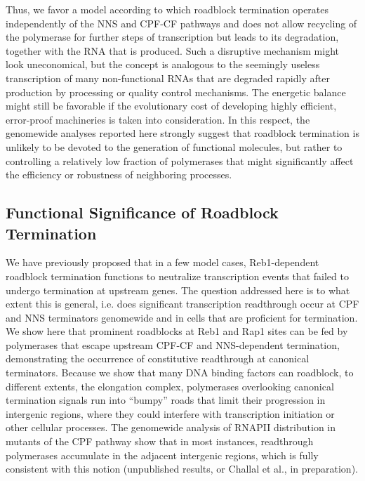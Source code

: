 Thus, we favor a model according to which roadblock termination operates independently of the NNS and CPF-CF pathways and does not allow recycling of the polymerase for further steps of transcription but leads to its degradation, together with the RNA that is produced. Such a disruptive mechanism might look uneconomical, but the concept is analogous to the seemingly useless transcription of many non-functional RNAs that are degraded rapidly after production by processing or quality control mechanisms. The energetic balance might still be favorable if the evolutionary cost of developing highly efficient, error-proof machineries is taken into consideration. In this respect, the genomewide analyses reported here strongly suggest that roadblock termination is unlikely to be devoted to the generation of functional molecules, but rather to controlling a relatively low fraction of polymerases that might significantly affect the efficiency or robustness of neighboring processes.


\singlespacing
\subsection*{Functional Significance of Roadblock Termination}
\doublespacing

We have previously proposed that in a few model cases, Reb1-dependent roadblock termination functions to neutralize transcription events that failed to undergo termination at upstream genes. The question addressed here is to what extent this is general, i.e. does significant transcription readthrough occur at CPF and NNS terminators genomewide and in cells that are proficient for termination. We show here that prominent roadblocks at Reb1 and Rap1 sites can be fed by polymerases that escape upstream CPF-CF and NNS-dependent termination, demonstrating the occurrence of constitutive readthrough at canonical terminators. Because we show that many DNA binding factors can roadblock, to different extents, the elongation complex, polymerases overlooking canonical termination signals run into “bumpy” roads that limit their progression in intergenic regions, where they could interfere with transcription initiation or other cellular processes. The genomewide analysis of RNAPII distribution in mutants of the CPF pathway show that in most instances, readthrough polymerases accumulate in the adjacent intergenic regions, which is fully consistent with this notion (unpublished results, or Challal et al., in preparation). 

